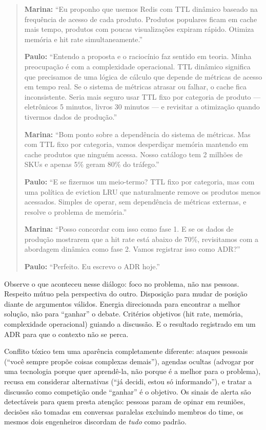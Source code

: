 \begin{quote}
\textbf{Marina:} ``Eu proponho que usemos Redis com TTL dinâmico baseado na
frequência de acesso de cada produto. Produtos populares ficam em cache mais
tempo, produtos com poucas visualizações expiram rápido. Otimiza memória e
hit rate simultaneamente.''

\textbf{Paulo:} ``Entendo a proposta e o raciocínio faz sentido em teoria.
Minha preocupação é com a complexidade operacional. TTL dinâmico significa
que precisamos de uma lógica de cálculo que depende de métricas de acesso em
tempo real. Se o sistema de métricas atrasar ou falhar, o cache fica
inconsistente. Seria mais seguro usar TTL fixo por categoria de produto ---
eletrônicos 5 minutos, livros 30 minutos --- e revisitar a otimização quando
tivermos dados de produção.''

\textbf{Marina:} ``Bom ponto sobre a dependência do sistema de métricas. Mas
com TTL fixo por categoria, vamos desperdiçar memória mantendo em cache
produtos que ninguém acessa. Nosso catálogo tem 2 milhões de SKUs e apenas
5\% geram 80\% do tráfego.''

\textbf{Paulo:} ``E se fizermos um meio-termo? TTL fixo por categoria, mas
com uma política de eviction LRU que naturalmente remove os produtos menos
acessados. Simples de operar, sem dependência de métricas externas, e
resolve o problema de memória.''

\textbf{Marina:} ``Posso concordar com isso como fase 1. E se os dados de
produção mostrarem que a hit rate está abaixo de 70\%, revisitamos com a
abordagem dinâmica como fase 2. Vamos registrar isso como ADR?''

\textbf{Paulo:} ``Perfeito. Eu escrevo o ADR hoje.''
\end{quote}

Observe o que aconteceu nesse diálogo: foco no problema, não nas pessoas.
Respeito mútuo pela perspectiva do outro. Disposição para mudar de posição
diante de argumentos válidos. Energia direcionada para encontrar a melhor
solução, não para ``ganhar'' o debate. Critérios objetivos (hit rate, memória,
complexidade operacional) guiando a discussão. E o resultado registrado em um
ADR para que o contexto não se perca.

Conflito tóxico tem uma aparência completamente diferente: ataques pessoais
(``você sempre propõe coisas complexas demais''), agendas ocultas (advogar por
uma tecnologia porque quer aprendê-la, não porque é a melhor para o problema),
recusa em considerar alternativas (``já decidi, estou só informando''), e
tratar a discussão como competição onde ``ganhar'' é o objetivo. Os sinais
de alerta são detectáveis para quem presta atenção: pessoas param de opinar
em reuniões, decisões são tomadas em conversas paralelas excluindo membros
do time, os mesmos dois engenheiros discordam de \textit{tudo} como padrão.

